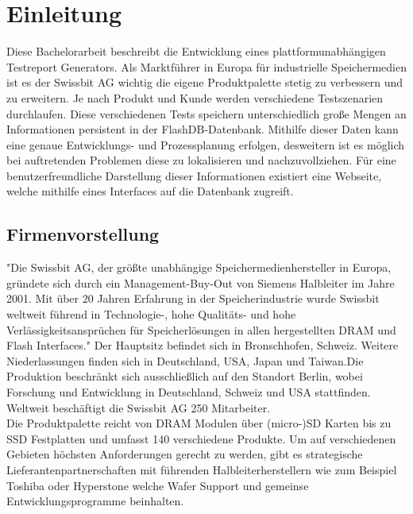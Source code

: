 \chapter{Einleitung}

	\vspace{10mm}
	
	Diese Bachelorarbeit beschreibt die Entwicklung eines plattformunabhängigen Testreport Generators. Als Marktführer in Europa für industrielle Speichermedien ist es der Swissbit AG wichtig die eigene Produktpalette stetig zu verbessern und zu erweitern. Je nach Produkt und Kunde werden verschiedene Testszenarien durchlaufen. Diese verschiedenen Tests speichern unterschiedlich große Mengen an Informationen persistent in der FlashDB-Datenbank. Mithilfe dieser Daten kann eine genaue Entwicklungs- und Prozessplanung erfolgen, desweitern ist es möglich bei auftretenden Problemen diese zu lokalisieren und nachzuvollziehen. Für eine benutzerfreundliche Darstellung dieser Informationen existiert eine Webseite, welche mithilfe eines Interfaces auf die Datenbank zugreift.  
	
	\vspace{5mm}
	
\section{Firmenvorstellung}
	
	"Die Swissbit AG, der größte unabhängige Speichermedienhersteller in Europa, gründete sich durch ein Management-Buy-Out von Siemens Halbleiter im Jahre 2001. Mit über 20 Jahren Erfahrung in der Speicherindustrie wurde Swissbit weltweit führend in Technologie-, hohe Qualitäts- und hohe Verlässigkeitsansprüchen für Speicherlösungen in allen hergestellten DRAM und Flash Interfaces." \cite{SwissbitAbout}
Der Hauptsitz befindet sich in Bronschhofen, Schweiz. Weitere Niederlassungen finden sich in Deutschland, USA, Japan und Taiwan.Die Produktion beschränkt sich ausschließlich auf den Standort Berlin, wobei Forschung und Entwicklung in Deutschland, Schweiz und USA stattfinden. Weltweit beschäftigt die Swissbit AG 250 Mitarbeiter. \\
Die Produktpalette reicht von DRAM Modulen über (micro-)SD Karten bis zu SSD Festplatten und umfasst 140 verschiedene Produkte. Um auf verschiedenen Gebieten höchsten Anforderungen gerecht zu werden, gibt es strategische Lieferantenpartnerschaften mit führenden Halbleiterherstellern wie zum Beispiel Toshiba oder Hyperstone welche Wafer Support und gemeinse Entwicklungsprogramme beinhalten.

